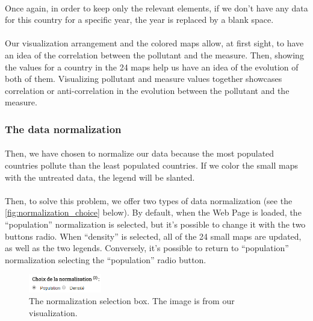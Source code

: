 \documentclass[preprint,journal]{vgtc}       %
\begin{document}
\paragraph{}
Once again, in order to keep only the relevant elements, if we don’t have any data for this country for a specific year, the year is replaced by a blank space.
\paragraph{}
Our visualization arrangement and the colored maps allow, at first sight, to have an idea of the correlation between the pollutant and the measure. Then, showing the values for a country in the 24 maps help us have an idea of the evolution of both of them. Visualizing pollutant and measure values together showcases correlation or anti-correlation in the evolution between the pollutant and the measure.

\subsubsection{The data normalization}
\paragraph{}
Then, we have chosen to normalize our data because the most populated countries pollute than the least populated countries. If we color the small maps with the untreated data, the legend will be slanted. 
\paragraph{}
Then, to solve this problem, we offer two types of data normalization (see the \autoref{fig:normalization_choice} below). By default, when the Web Page is loaded, the “population” normalization is selected, but it’s possible to change it with the two buttons radio. When “density” is selected, all of the 24 small maps are updated, as well as the two legends. Conversely, it’s possible to return to “population” normalization selecting the “population” radio button. 

\begin{figure}[H]
 \centering %
 \includegraphics[width=120px]{choice2}
 \caption{The normalization selection box. The image is from our visualization.}
 \label{fig:normalization_choice}
\end{figure}
\end{document}
